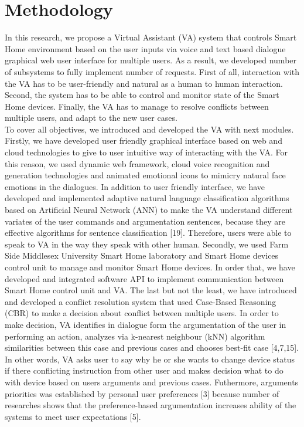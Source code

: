 \documentclass{llncs}
\begin{document}
    \section{Methodology}
    In this research, we propose a Virtual Assistant (VA) system that controls Smart Home environment based on the user inputs via
    voice and text based dialogue graphical web user interface for multiple users. As a result, we developed number of
    subsystems to fully implement number of requests. First of all, interaction with the VA has to be user-friendly and
    natural as a human to human interaction. Second, the system has to be able to control and monitor state of the Smart
    Home devices. Finally, the VA has to manage to resolve conflicts between multiple users, and adapt to the new user cases.\\
    To cover all objectives, we introduced and developed the VA with next modules. Firstly, we have developed user friendly
    graphical interface based on web and cloud technologies to give to user intuitive way of interacting with the VA. For this
    reason, we used dynamic web framework, cloud voice recognition and generation technologies and animated emotional icons
    to mimicry natural face emotions in the dialogues. In addition to user friendly interface, we have developed and implemented
    adaptive natural language classification algorithms based on Artificial Neural Network (ANN) to make the VA understand
    different variates of the user commands and argumentation sentences, because they are effective algorithms for
    sentence classification [19]. Therefore, users were able to speak to
    VA in the way they speak with other human. Secondly, we used Farm Side Middlesex University Smart Home laboratory and
    Smart Home devices control unit to manage and monitor Smart Home devices. In order that, we have developed and integrated
    software API to implement communication between Smart Home control unit and VA. The last but not the least, we have
    introduced and developed a conflict resolution system that used Case-Based Reasoning (CBR) to make a decision about
    conflict between multiple users. In order to make decision, VA identifies in dialogue form the argumentation of the user
    in performing an action, analyzes via k-nearest neighbour (kNN) algorithm similarities between
    this case and previous cases and chooses best-fit case [4,7,15]. In other words, VA asks user to say why he or she wants to change
    device status if there conflicting instruction from other user and makes decision what to do with device based on users
    arguments and previous cases. Futhermore, arguments priorities was established by personal user preferences [3] because
    number of researches shows that the preference-based argumentation increases ability of the systems to meet user
    expectations [5].
\end{document}
